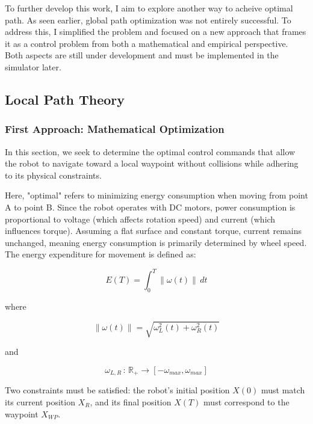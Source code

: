 \documentclass[../main.tex]{subfiles}
\begin{document}
To further develop this work, I aim to explore another way to acheive optimal path. As seen earlier, global path optimization was not entirely successful. To address this, I simplified the problem and focused on a new approach that frames it as a control problem from both a mathematical and empirical perspective. Both aspects are still under development and must be implemented in the simulator later.

\subsection*{Local Path Theory}

\subsubsection*{First Approach: Mathematical Optimization}

In this section, we seek to determine the optimal control commands that allow the robot to navigate toward a local waypoint without collisions while adhering to its physical constraints.

\vspace{1em}

Here, "optimal" refers to minimizing energy consumption when moving from point A to point B. Since the robot operates with DC motors, power consumption is proportional to voltage (which affects rotation speed) and current (which influences torque). Assuming a flat surface and constant torque, current remains unchanged, meaning energy consumption is primarily determined by wheel speed. The energy expenditure for movement is defined as:

\begin{equation}
    E(T) = \int_{0}^{T} \| \omega(t) \| \, dt
\end{equation}

where

\begin{equation}
    \| \omega (t) \| = \sqrt{\omega_L^{2}(t) + \omega_R^{2}(t)}
\end{equation}

and

\begin{equation}
    \omega_{L, R} \,:\, \mathbb{R}_+ \longrightarrow [-\omega_{max}, \omega_{max}]
\end{equation}

Two constraints must be satisfied: the robot's initial position $X(0)$ must match its current position $X_R$, and its final position $X(T)$ must correspond to the waypoint $X_{WP}$.
\end{document}
